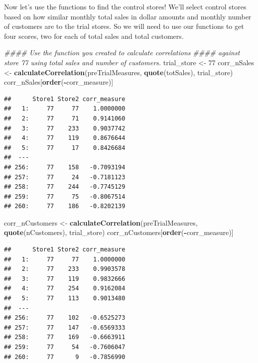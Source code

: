 \documentclass[
]{article}
\newenvironment{Shaded}{\begin{snugshade}}{\end{snugshade}}
\newcommand{\CommentTok}[1]{\textcolor[rgb]{0.56,0.35,0.01}{\textit{#1}}}
\newcommand{\DecValTok}[1]{\textcolor[rgb]{0.00,0.00,0.81}{#1}}
\newcommand{\KeywordTok}[1]{\textcolor[rgb]{0.13,0.29,0.53}{\textbf{#1}}}
\newcommand{\NormalTok}[1]{#1}
\newcommand{\OperatorTok}[1]{\textcolor[rgb]{0.81,0.36,0.00}{\textbf{#1}}}
\newcommand{\StringTok}[1]{\textcolor[rgb]{0.31,0.60,0.02}{#1}}
\begin{document}
Now let's use the functions to find the control stores! We'll select
control stores based on how similar monthly total sales in dollar
amounts and monthly number of customers are to the trial stores. So we
will need to use our functions to get four scores, two for each of total
sales and total customers.

\begin{Shaded}
\begin{Highlighting}[]
\CommentTok{#### Use the function you created to calculate correlations }
\CommentTok{#### against store 77 using total sales and number of customers.}
\NormalTok{trial_store <-}\StringTok{ }\DecValTok{77}
\NormalTok{corr_nSales <-}\StringTok{ }\KeywordTok{calculateCorrelation}\NormalTok{(preTrialMeasures, }\KeywordTok{quote}\NormalTok{(totSales), trial_store)}
\NormalTok{corr_nSales[}\KeywordTok{order}\NormalTok{(}\OperatorTok{-}\NormalTok{corr_measure)]}
\end{Highlighting}
\end{Shaded}

\begin{verbatim}
##      Store1 Store2 corr_measure
##   1:     77     77    1.0000000
##   2:     77     71    0.9141060
##   3:     77    233    0.9037742
##   4:     77    119    0.8676644
##   5:     77     17    0.8426684
##  ---                           
## 256:     77    158   -0.7093194
## 257:     77     24   -0.7181123
## 258:     77    244   -0.7745129
## 259:     77     75   -0.8067514
## 260:     77    186   -0.8202139
\end{verbatim}

\begin{Shaded}
\begin{Highlighting}[]
\NormalTok{corr_nCustomers <-}\StringTok{ }\KeywordTok{calculateCorrelation}\NormalTok{(preTrialMeasures, }\KeywordTok{quote}\NormalTok{(nCustomers), trial_store)}
\NormalTok{corr_nCustomers[}\KeywordTok{order}\NormalTok{(}\OperatorTok{-}\NormalTok{corr_measure)]}
\end{Highlighting}
\end{Shaded}

\begin{verbatim}
##      Store1 Store2 corr_measure
##   1:     77     77    1.0000000
##   2:     77    233    0.9903578
##   3:     77    119    0.9832666
##   4:     77    254    0.9162084
##   5:     77    113    0.9013480
##  ---                           
## 256:     77    102   -0.6525273
## 257:     77    147   -0.6569333
## 258:     77    169   -0.6663911
## 259:     77     54   -0.7606047
## 260:     77      9   -0.7856990
\end{verbatim}
\end{document}
